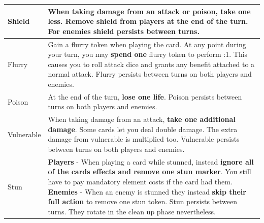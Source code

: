 \begin{longtable}{|p{2.5cm}|p{13.7cm}|}
	\hline
	Shield \symShield & When taking damage from an \symAttack attack or \symPoison poison, \textbf{take one less}. Remove shield from players at the end of the turn. For enemies shield persists between turns. \\
	\hline
	Flurry \symFlurry & Gain a flurry token when playing the card. At any point during your turn, you may \textbf{spend one} flurry token to perform \symAttack:1. This causes you to roll attack dice and grants any benefit attached to a normal attack. Flurry persists between turns on both players and enemies. \\
	\hline
	Poison \symPoison & At the end of the turn, \textbf{lose one life}. Poison persists between turns on both players and enemies.\\
	\hline
	Vulnerable \symVulnerable & When taking damage from an attack, \textbf{take one additional damage}. Some cards let you deal double damage. The extra damage from vulnerable is multiplied too. Vulnerable persists between turns on both players and enemies. \\
	\hline
	Stun \symStun & \textbf{Players} - When playing a card while stunned, instead \textbf{ignore all of the cards effects and remove one stun marker}. You still have to pay mandatory element costs if the card had them. \hspace*{12cm} \linebreak \textbf{Enemies} - When an enemy is stunned they instead \textbf{skip their full action} to remove one stun token. Stun persists between turns. They rotate in the clean up phase nevertheless.\\
	\hline
\end{longtable}